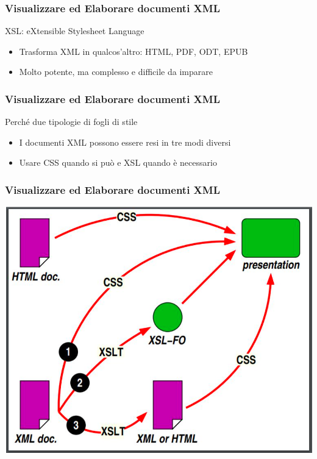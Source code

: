 \documentclass{beamer}
\begin{document}
    \begin{frame}
        \frametitle{Visualizzare ed Elaborare documenti XML}
        \addtocounter{nframe}{1}
        
        \begin{block}{XSL: eXtensible Stylesheet Language}
           
           \begin{itemize}
               \item Trasforma XML in qualcos'altro: HTML, PDF, ODT, EPUB
               \item Molto potente, ma complesso e difficile da imparare
           \end{itemize}
        \end{block}
        
    \end{frame}


    \begin{frame}
        \frametitle{Visualizzare ed Elaborare documenti XML}
        \addtocounter{nframe}{1}
        
        \begin{block}{Perché due tipologie di fogli di stile}
           
           \begin{itemize}
               \item I documenti XML possono essere resi in tre modi diversi
               \item Usare CSS quando si può e XSL quando è necessario
           \end{itemize}
        \end{block}
        
    \end{frame}


    \begin{frame}
        \frametitle{Visualizzare ed Elaborare documenti XML}
        \addtocounter{nframe}{1}
        
        \begin{center}
            \includegraphics[width=.9\textwidth]{imgs/XML-VisualModality.png}
        \end{center}
    
    \end{frame}
\end{document}
